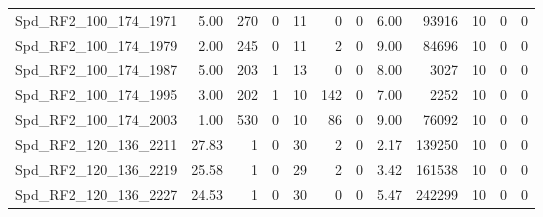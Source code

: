 \begin{longtable}[c]{@{}lrrrrrrrrrrr@{}}
Spd\_RF2\_100\_174\_1971     & 5.00                   & 270                     & 0                       & 11                     & 0                       & 0                       & 6.00                    & 93916                    & 10                       & 0                        & 0                        \\
Spd\_RF2\_100\_174\_1979     & 2.00                   & 245                     & 0                       & 11                     & 2                       & 0                       & 9.00                    & 84696                    & 10                       & 0                        & 0                        \\
Spd\_RF2\_100\_174\_1987     & 5.00                   & 203                     & 1                       & 13                     & 0                       & 0                       & 8.00                    & 3027                     & 10                       & 0                        & 0                        \\
Spd\_RF2\_100\_174\_1995     & 3.00                   & 202                     & 1                       & 10                     & 142                     & 0                       & 7.00                    & 2252                     & 10                       & 0                        & 0                        \\
Spd\_RF2\_100\_174\_2003     & 1.00                   & 530                     & 0                       & 10                     & 86                      & 0                       & 9.00                    & 76092                    & 10                       & 0                        & 0                        \\
Spd\_RF2\_120\_136\_2211     & 27.83                  & 1                       & 0                       & 30                     & 2                       & 0                       & 2.17                    & 139250                   & 10                       & 0                        & 0                        \\
Spd\_RF2\_120\_136\_2219     & 25.58                  & 1                       & 0                       & 29                     & 2                       & 0                       & 3.42                    & 161538                   & 10                       & 0                        & 0                        \\
Spd\_RF2\_120\_136\_2227     & 24.53                  & 1                       & 0                       & 30                     & 0                       & 0                       & 5.47                    & 242299                   & 10                       & 0                        & 0                        \\

\end{longtable}
